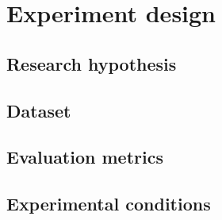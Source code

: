 \section{Experiment design}

\subsection{Research hypothesis}
\subsection{Dataset}
\subsection{Evaluation metrics}
\subsection{Experimental conditions}